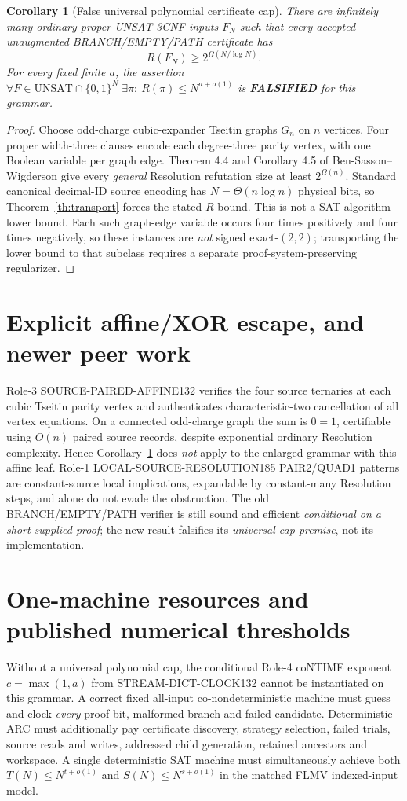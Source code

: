 \documentclass[11pt]{article}
\newtheorem{corollary}[theorem]{Corollary}
\begin{document}
\begin{corollary}[False universal polynomial certificate cap]\label{cor:hard}
There are infinitely many ordinary proper UNSAT 3CNF inputs $F_N$ such that every accepted unaugmented BRANCH/EMPTY/PATH certificate has
\[
 R(F_N)\ge 2^{\Omega(N/\log N)}.
\]
For every fixed finite $a$, the assertion $\forall F\in\mathrm{UNSAT}\cap\{0,1\}^N\;\exists\pi:\ R(\pi)\le N^{a+o(1)}$ is \textbf{FALSIFIED} for this grammar.
\end{corollary}
\begin{proof}
Choose odd-charge cubic-expander Tseitin graphs $G_n$ on $n$ vertices. Four proper width-three clauses encode each degree-three parity vertex, with one Boolean variable per graph edge. Theorem 4.4 and Corollary 4.5 of Ben-Sasson--Wigderson \cite{bsw} give every \emph{general} Resolution refutation size at least $2^{\Omega(n)}$. Standard canonical decimal-ID source encoding has $N=\Theta(n\log n)$ physical bits, so Theorem~\ref{th:transport} forces the stated $R$ bound. This is not a SAT algorithm lower bound. Each such graph-edge variable occurs four times positively and four times negatively, so these instances are \emph{not} signed exact-$(2,2)$; transporting the lower bound to that subclass requires a separate proof-system-preserving regularizer.
\end{proof}

\section{Explicit affine/XOR escape, and newer peer work}
Role-3 SOURCE-PAIRED-AFFINE132 verifies the four source ternaries at each cubic Tseitin parity vertex and authenticates characteristic-two cancellation of all vertex equations. On a connected odd-charge graph the sum is $0=1$, certifiable using $O(n)$ paired source records, despite exponential ordinary Resolution complexity. Hence Corollary~\ref{cor:hard} does \emph{not} apply to the enlarged grammar with this affine leaf. Role-1 LOCAL-SOURCE-RESOLUTION185 PAIR2/QUAD1 patterns are constant-source local implications, expandable by constant-many Resolution steps, and alone do not evade the obstruction. The old BRANCH/EMPTY/PATH verifier is still sound and efficient \emph{conditional on a short supplied proof}; the new result falsifies its \emph{universal cap premise}, not its implementation.

\section{One-machine resources and published numerical thresholds}
Without a universal polynomial cap, the conditional Role-4 coNTIME exponent $c=\max(1,a)$ from STREAM-DICT-CLOCK132 cannot be instantiated on this grammar. A correct fixed all-input co-nondeterministic machine must guess and clock \emph{every} proof bit, malformed branch and failed candidate. Deterministic ARC must additionally pay certificate discovery, strategy selection, failed trials, source reads and writes, addressed child generation, retained ancestors and workspace. A single deterministic SAT machine must simultaneously achieve both $T(N)\le N^{t+o(1)}$ and $S(N)\le N^{s+o(1)}$ in the matched FLMV indexed-input model.
\end{document}
